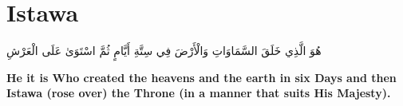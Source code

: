 \chapter{Istawa}
\begin{center}
    {\Huge    
        \begin{Arabic}
            هُوَ الَّذِي خَلَقَ السَّمَاوَاتِ وَالْأَرْضَ فِي سِتَّةِ أَيَّامٍ ثُمَّ اسْتَوَىٰ عَلَى الْعَرْشِ
        \end{Arabic}
    }
\end{center}
\vspace*{\fill}
\vspace{3cm}
\begin{center}
    \large \textbf{He it is Who created the heavens and the earth in six Days and then Istawa (rose over) the Throne (in a manner that suits His Majesty).}
\end{center}
